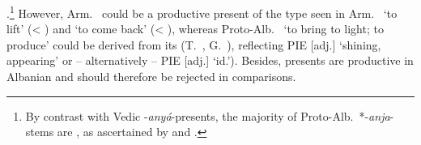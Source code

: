 \documentclass[output=paper,colorlinks,citecolor=brown]{langscibook}
\begin{document}
.\footnote{By contrast with Vedic -\textit{anyá}-presents,  the majority of Proto-Alb.\ *-\textit{anja}-stems   are , as ascertained by \citet[169--170]{Genesin2005} and \citet[50--51]{SchumacherMatzinger2013}.} However, Arm.\  could be a productive present of the type seen in Arm.\  ‘to lift’ (< ) and  ‘to come back’ (< ), whereas Proto-Alb.\  ‘to bring to light; to produce’ could be derived from its   (T.\ , G.\ ), reflecting PIE  [adj.] ‘shining, appearing’ or – alternatively – PIE  [adj.] ‘id.’). Besides, presents are productive in Albanian and should therefore be rejected in comparisons. 
\end{document}
